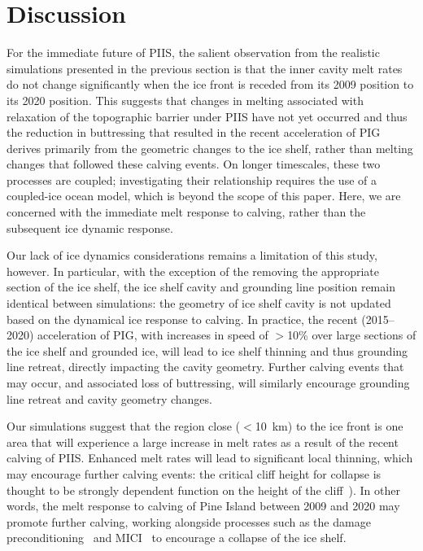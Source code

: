 \documentclass[draft]{agujournal2019}
\begin{document}
\section{Discussion}\label{S:Discussion}

For the immediate future of PIIS, the salient observation from the realistic simulations presented in the previous section is that the inner cavity melt rates do not change significantly when the ice front is receded from its 2009 position to its 2020 position. This suggests that changes in melting associated with relaxation of the topographic barrier under PIIS have not yet occurred and thus the reduction in buttressing that resulted in the recent acceleration of PIG \cite{Joughin2021ScienceAdv} derives primarily from the geometric changes to the ice shelf, rather than melting changes that followed these calving events. On longer timescales, these two processes are coupled; investigating their relationship requires the use of a coupled-ice ocean model, which is beyond the scope of this paper. Here, we are concerned with the immediate melt response to calving, rather than the subsequent ice dynamic response. 

Our lack of ice dynamics considerations remains a limitation of this study, however. In particular, with the exception of the removing the appropriate section of the ice shelf, the ice shelf cavity and grounding line position remain identical between simulations: the geometry of ice shelf cavity is not updated based on the dynamical ice response to calving. In practice, the recent (2015--2020) acceleration of PIG, with increases in speed of $>$10\% over large sections of the ice shelf and grounded ice, will lead to ice shelf thinning and thus grounding line retreat, directly impacting the cavity geometry.  Further calving events that may occur, and associated loss of buttressing, will similarly encourage grounding line retreat and cavity geometry changes. 

Our simulations suggest that the region close ($<$10~km) to the ice front is one area that will experience a large increase in melt rates as a result of the recent calving of PIIS. Enhanced melt rates will lead to significant local thinning, which may encourage further calving events: the critical cliff height for collapse is thought to be strongly dependent function on the height of the cliff~\cite[ for example]{Crawford2021NatureComms}). In other words, the melt response to calving of Pine Island between 2009 and 2020 may promote further calving, working alongside processes such as the damage preconditioning~\cite{Lhermitte2020PNAS} and MICI~\cite{deconto2016Nature} to encourage a collapse of the ice shelf. 
\end{document}

